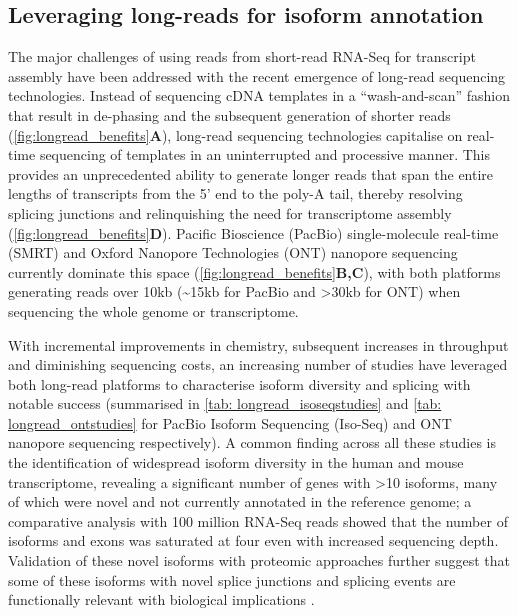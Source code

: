 \subsection{Leveraging long-reads for isoform annotation}
The major challenges of using reads from short-read RNA-Seq for transcript assembly have been addressed with the recent emergence of long-read sequencing technologies. Instead of sequencing cDNA templates in a “wash-and-scan” fashion that result in de-phasing and the subsequent generation of shorter reads (\cref{fig:longread_benefits}\textbf{A}), long-read sequencing technologies capitalise on real-time sequencing of templates in an uninterrupted and processive manner. This provides an unprecedented ability to generate longer reads that span the entire lengths of transcripts from the 5' end to the poly-A tail, thereby resolving splicing junctions and relinquishing the need for transcriptome assembly (\cref{fig:longread_benefits}\textbf{D}). Pacific Bioscience (PacBio) single-molecule real-time (SMRT) and Oxford Nanopore Technologies (ONT) nanopore sequencing currently dominate this space (\cref{fig:longread_benefits}\textbf{B,C}), with both platforms generating reads over 10kb (\textasciitilde15kb for PacBio and >30kb for ONT) when sequencing the whole genome or transcriptome.  

With incremental improvements in chemistry, subsequent increases in throughput and diminishing sequencing costs, an increasing number of studies have leveraged both long-read platforms to characterise isoform diversity and splicing with notable success (summarised in \cref{tab: longread_isoseqstudies} and \cref{tab: longread_ontstudies} for PacBio Isoform Sequencing (Iso-Seq) and ONT nanopore sequencing respectively). A common finding across all these studies is the identification of widespread isoform diversity in the human and mouse transcriptome\cite{Sharon2013, Au2013,Tseng2019,DeslattesMays2019}, revealing a significant number of genes with >10 isoforms, many of which were novel and not currently annotated in the reference genome; a comparative analysis with 100 million RNA-Seq reads showed that the number of isoforms and exons was saturated at four even with increased sequencing depth\cite{DeslattesMays2019}. Validation of these novel isoforms with proteomic approaches further suggest that some of these isoforms with novel splice junctions and splicing events are functionally relevant with biological implications \cite{Huang2021}. 

